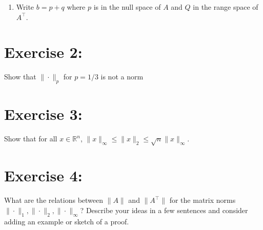 \documentclass{article}
\newcommand{\R}{\mathbb{R}}
\begin{document}
\begin{enumerate}
\begin{equation*}
\begin{array}{rrr}
                1 & 1 & 0\\
                0 & 1 & \frac{1}{2}\\
                0 & 0 & 1\\
                0 & 0 & 0
            \end{array}
        \right)
        \overset{R_2-\frac{1}{2}R_3}{\underset{R_1-R_2}\longrightarrow}
        \left(
            \begin{array}{rrr}
                1 & 0 & 0\\
                0 & 1 & 0\\
                0 & 0 & 1\\
                0 & 0 & 0
            \end{array}
        \right)
    \end{equation*}
    

    
    \item Write $b = p + q$ where $p$ is in the null space of $A$ and $Q$ in the range space of $A^\top$.
\end{enumerate}

\section*{Exercise 2:}

Show that $\| \cdot \|_p$ for $p=1/3$ is not a norm 

\section*{Exercise 3:}

Show that for all $x\in\R^n$, $\|x\|_{\infty} \leq \|x\|_2 \leq \sqrt{n}\|x\|_{\infty}$.

\section*{Exercise 4:}

What are the relations between $\|A \|$ and $\|A^\top\|$ for the matrix norms $\|\cdot\|_1, \|\cdot\|_2, \|\cdot\|_{\infty}$? Describe your ideas in a few sentences and consider adding an example or sketch of a proof.
\end{document}
